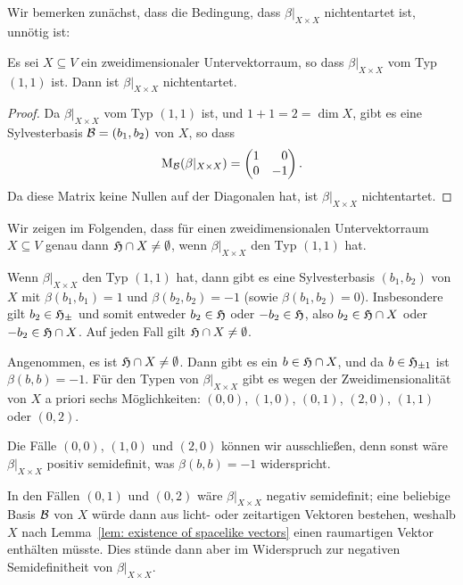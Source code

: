 \documentclass[a4paper,10pt,numbers=noenddot]{scrartcl}
\begin{document}
\subsection{}


Wir bemerken zunächst, dass die Bedingung, dass $\beta|_{X \times X}$ nichtentartet ist, unnötig ist:


\begin{lemma}
  Es sei $X \subseteq V$ ein zweidimensionaler Untervektorraum, so dass $\beta|_{X \times X}$ vom Typ $(1,1)$ ist.
  Dann ist $\beta|_{X \times X}$ nichtentartet.
\end{lemma}
\begin{proof}
  Da $\beta|_{X \times X}$ vom Typ $(1,1)$ ist, und $1 + 1 = 2 = \dim X$, gibt es eine Sylvesterbasis $\mathcal{B} = (b_1, b_2)$ von $X$, so dass
  \[
    \Mat_\mc{B}(\beta|_{X \times X})
    =
    \begin{pmatrix*}[r]
      1 &  0  \\
      0 & -1
    \end{pmatrix*}.
  \]
  Da diese Matrix keine Nullen auf der Diagonalen hat, ist $\beta|_{X \times X}$ nichtentartet.
\end{proof}


Wir zeigen im Folgenden, dass für einen zweidimensionalen Untervektorraum $X \subseteq V$ genau dann $\mathfrak{H} \cap X \neq \emptyset$, wenn $\beta|_{X \times X}$ den Typ $(1,1)$ hat.

Wenn $\beta|_{X \times X}$ den Typ $(1,1)$ hat, dann gibt es eine Sylvesterbasis $(b_1, b_2)$ von $X$ mit $\beta(b_1, b_1) = 1$ und $\beta(b_2, b_2) = -1$ (sowie $\beta(b_1, b_2) = 0$).
Insbesondere gilt $b_2 \in \mathfrak{H}_{\pm}$ und somit entweder $b_2 \in \mathfrak{H}$ oder $-b_2 \in \mathfrak{H}$, also $b_2 \in \mathfrak{H} \cap X$ oder $-b_2 \in \mathfrak{H} \cap X$.
Auf jeden Fall gilt $\mathfrak{H} \cap X \neq \emptyset$.

Angenommen, es ist $\mathfrak{H} \cap X \neq \emptyset$.
Dann gibt es ein $b \in \mathfrak{H} \cap X$, und da $b \in \mathfrak{H}_{\pm 1}$ ist $\beta(b,b) = -1$.
Für den Typen von $\beta|_{X \times X}$ gibt es wegen der Zweidimensionalität von $X$ a priori sechs Möglichkeiten: $(0,0)$, $(1,0)$, $(0,1)$, $(2,0)$, $(1,1)$ oder $(0,2)$.

Die Fälle $(0,0)$, $(1,0)$ und $(2,0)$ können wir ausschließen, denn sonst wäre $\beta|_{X \times X}$ positiv semidefinit, was $\beta(b,b) = -1$ widerspricht.

In den Fällen $(0,1)$ und $(0,2)$ wäre $\beta|_{X \times X}$ negativ semidefinit; eine beliebige Basis $\mathcal{B}$ von $X$ würde dann aus licht- oder zeitartigen Vektoren bestehen, weshalb $X$ nach Lemma~\ref{lem: existence of spacelike vectors} einen raumartigen Vektor enthälten müsste.
Dies stünde dann aber im Widerspruch zur negativen Semidefinitheit von $\beta|_{X \times X}$.
\end{document}
